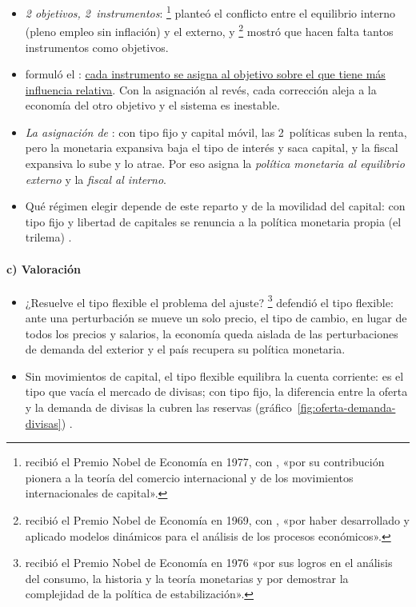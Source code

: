\documentclass[11pt]{article}
\begin{document}
\begin{itemize}
\item \emph{2 objetivos, 2~instrumentos}: \textcite{Meade1951}\footnote{ recibió el Premio Nobel de Economía en 1977, con , «por su contribución pionera a la teoría del comercio internacional y de los movimientos internacionales de capital»\nocite{Nobel1977MeadeOhlin}.} planteó el conflicto entre el equilibrio interno (pleno empleo sin inflación) y el externo, y \textcite{Tinbergen1952Theory}\footnote{ recibió el Premio Nobel de Economía en 1969, con , «por haber desarrollado y aplicado modelos dinámicos para el análisis de los procesos económicos»\nocite{Nobel1969}.} mostró que hacen falta tantos instrumentos como objetivos.
\item \textcite{Mundell1960Monetary} formuló el : \uline{cada instrumento se asigna al objetivo sobre el que tiene más influencia relativa}. Con la asignación al revés, cada corrección aleja a la economía del otro objetivo y el sistema es inestable\nocite{Boughton2003Origins}.
\item \emph{La asignación de }: con tipo fijo y capital móvil, las 2~políticas suben la renta, pero la monetaria expansiva baja el tipo de interés y saca capital, y la fiscal expansiva lo sube y lo atrae. Por eso \textcite{Mundell1962Appropriate} asigna la \emph{política monetaria al equilibrio externo} y la \emph{fiscal al interno}.
\item Qué régimen elegir depende de este reparto y de la movilidad del capital: con tipo fijo y libertad de capitales se renuncia a la política monetaria propia (el trilema) .
\end{itemize}

\paragraph{c) Valoración}

\begin{itemize}
\item ¿Resuelve el tipo flexible el problema del ajuste? \textcite{Friedman1953Case}\footnote{ recibió el Premio Nobel de Economía en 1976 «por sus logros en el análisis del consumo, la historia y la teoría monetarias y por demostrar la complejidad de la política de estabilización»\nocite{Nobel1976Friedman}.} defendió el tipo flexible: ante una perturbación se mueve un solo precio, el tipo de cambio, en lugar de todos los precios y salarios, la economía queda aislada de las perturbaciones de demanda del exterior y el país recupera su política monetaria.
\item Sin movimientos de capital, el tipo flexible equilibra la cuenta corriente: es el tipo que vacía el mercado de divisas; con tipo fijo, la diferencia entre la oferta y la demanda de divisas la cubren las reservas (gráfico~\ref{fig:oferta-demanda-divisas}) .
\end{itemize}
\end{document}
